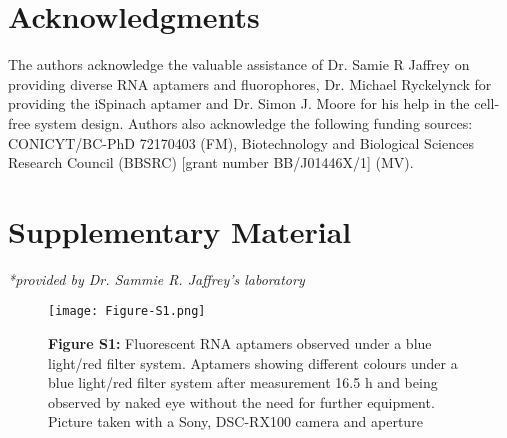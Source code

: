 \section{\textbf{Acknowledgments}}

  
The authors acknowledge the valuable assistance of Dr. Samie R Jaffrey on providing diverse RNA aptamers and fluorophores, Dr. Michael Ryckelynck for providing the iSpinach aptamer and Dr. Simon J. Moore for his help in the cell-free system design. Authors also acknowledge the following funding sources: CONICYT/BC-PhD 72170403 (FM), Biotechnology and Biological Sciences Research Council (BBSRC) [grant number BB/J01446X/1] (MV).

\section{\textbf{Supplementary Material}}


\begin{table}[h]

{\textit{*provided by Dr. Sammie R. Jaffrey's laboratory}}
\end{table}

\begin{figure*} [h] 
\begin{center}
\texttt{[image: Figure-S1.png]}
\end{center}
\captionsetup{labelformat=empty}
\caption{\textbf{Figure S1:} Fluorescent RNA aptamers observed under a blue  light/red  filter  system. Aptamers  showing  different  colours  under  a  blue  light/red  filter  system  after measurement 16.5 h and being observed by naked eye without the need for further equipment. Picture taken with a Sony, DSC-RX100 camera and aperture}
\label{NAR-figS1}%
\end{figure*}

